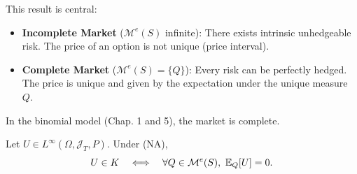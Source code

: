 \begin{tcolorbox}[title=Summary: Completeness and Uniqueness, colback=purple!5!white, colframe=purple!50!black]
This result is central:
\begin{itemize}
    \item \textbf{Incomplete Market} ($\mathcal{M}^e(S)$ infinite): There exists intrinsic unhedgeable risk. The price of an option is not unique (price interval).
    \item \textbf{Complete Market} ($\mathcal{M}^e(S) = \{Q\}$): Every risk can be perfectly hedged. The price is unique and given by the expectation under the unique measure $Q$.
\end{itemize}
In the binomial model (Chap. 1 and 5), the market is complete.
\end{tcolorbox}

\begin{lemma}\label{lem:10}
\label{lem:UinK_iff_EQ0}
Let $U\in L^\infty(\Omega,\mathcal{J}_T,P)$. Under (NA),
\begin{equation}
U\in K \quad \Longleftrightarrow \quad \forall Q\in\mathcal{M}^e(S),\ \E_Q[U]=0.
\end{equation}
\end{lemma}

